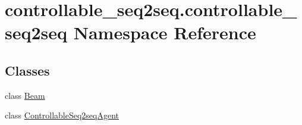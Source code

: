 \hypertarget{namespacecontrollable__seq2seq_1_1controllable__seq2seq}{}\section{controllable\+\_\+seq2seq.\+controllable\+\_\+seq2seq Namespace Reference}
\label{namespacecontrollable__seq2seq_1_1controllable__seq2seq}
\subsection*{Classes}
\begin{DoxyCompactItemize}
\item 
class \hyperlink{classcontrollable__seq2seq_1_1controllable__seq2seq_1_1Beam}{Beam}
\item 
class \hyperlink{classcontrollable__seq2seq_1_1controllable__seq2seq_1_1ControllableSeq2seqAgent}{Controllable\+Seq2seq\+Agent}
\end{DoxyCompactItemize}

